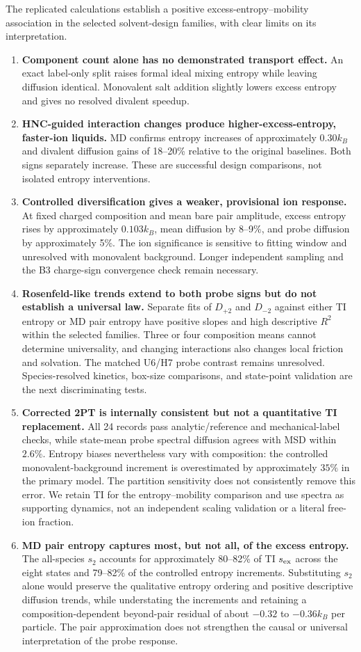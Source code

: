 The replicated calculations establish a positive excess-entropy--mobility association in the selected solvent-design families, with clear limits on its interpretation.
\begin{enumerate}
\item \textbf{Component count alone has no demonstrated transport effect.} An exact label-only split raises formal ideal mixing entropy while leaving diffusion identical. Monovalent salt addition slightly lowers excess entropy and gives no resolved divalent speedup.
\item \textbf{HNC-guided interaction changes produce higher-excess-entropy, faster-ion liquids.} MD confirms entropy increases of approximately $0.30k_B$ and divalent diffusion gains of 18--20\% relative to the original baselines. Both signs separately increase. These are successful design comparisons, not isolated entropy interventions.
\item \textbf{Controlled diversification gives a weaker, provisional ion response.} At fixed charged composition and mean bare pair amplitude, excess entropy rises by approximately $0.103k_B$, mean diffusion by 8--9\%, and probe diffusion by approximately 5\%. The ion significance is sensitive to fitting window and unresolved with monovalent background. Longer independent sampling and the B3 charge-sign convergence check remain necessary.
\item \textbf{Rosenfeld-like trends extend to both probe signs but do not establish a universal law.} Separate fits of $D_{+2}$ and $D_{-2}$ against either TI entropy or MD pair entropy have positive slopes and high descriptive $R^2$ within the selected families. Three or four composition means cannot determine universality, and changing interactions also changes local friction and solvation. The matched U6/H7 probe contrast remains unresolved. Species-resolved kinetics, box-size comparisons, and state-point validation are the next discriminating tests.
\item \textbf{Corrected 2PT is internally consistent but not a quantitative TI replacement.} All 24 records pass analytic/reference and mechanical-label checks, while state-mean probe spectral diffusion agrees with MSD within $2.6\%$. Entropy biases nevertheless vary with composition: the controlled monovalent-background increment is overestimated by approximately $35\%$ in the primary model. The partition sensitivity does not consistently remove this error. We retain TI for the entropy--mobility comparison and use spectra as supporting dynamics, not an independent scaling validation or a literal free-ion fraction.
\item \textbf{MD pair entropy captures most, but not all, of the excess entropy.} The all-species $s_2$ accounts for approximately 80--82\% of TI $s_{\rm ex}$ across the eight states and 79--82\% of the controlled entropy increments. Substituting $s_2$ alone would preserve the qualitative entropy ordering and positive descriptive diffusion trends, while understating the increments and retaining a composition-dependent beyond-pair residual of about $-0.32$ to $-0.36k_B$ per particle. The pair approximation does not strengthen the causal or universal interpretation of the probe response.
\end{enumerate}
